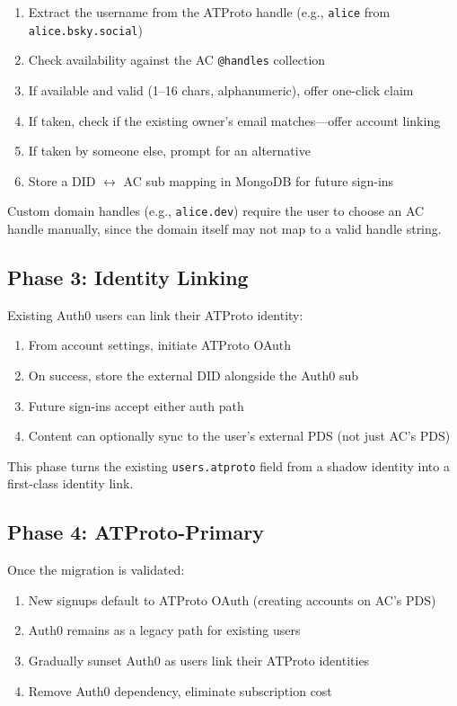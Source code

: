 \documentclass[10pt,letterpaper,twocolumn]{article}
\begin{document}
\begin{enumerate}
  \item Extract the username from the ATProto handle (e.g., \texttt{alice} from \texttt{alice.bsky.social})
  \item Check availability against the AC \texttt{@handles} collection
  \item If available and valid (1--16 chars, alphanumeric), offer one-click claim
  \item If taken, check if the existing owner's email matches---offer account linking
  \item If taken by someone else, prompt for an alternative
  \item Store a DID $\leftrightarrow$ AC sub mapping in MongoDB for future sign-ins
\end{enumerate}

Custom domain handles (e.g., \texttt{alice.dev}) require the user to choose an AC handle manually, since the domain itself may not map to a valid handle string.

\subsection{Phase 3: Identity Linking}

Existing Auth0 users can link their ATProto identity:

\begin{enumerate}
  \item From account settings, initiate ATProto OAuth
  \item On success, store the external DID alongside the Auth0 sub
  \item Future sign-ins accept either auth path
  \item Content can optionally sync to the user's external PDS (not just AC's PDS)
\end{enumerate}

This phase turns the existing \texttt{users.atproto} field from a shadow identity into a first-class identity link.

\subsection{Phase 4: ATProto-Primary}

Once the migration is validated:

\begin{enumerate}
  \item New signups default to ATProto OAuth (creating accounts on AC's PDS)
  \item Auth0 remains as a legacy path for existing users
  \item Gradually sunset Auth0 as users link their ATProto identities
  \item Remove Auth0 dependency, eliminate subscription cost
\end{enumerate}
\end{document}
